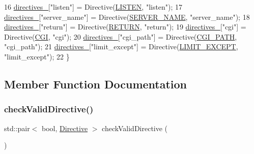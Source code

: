 \begin{DoxyCode}
16         \hyperlink{classft_1_1_parser_abe21d1e60d970dd268181e79250b5399}{directives\_}[\textcolor{stringliteral}{"listen"}] = Directive(\hyperlink{namespaceft_a5a5554dff10f0dc50bae4cc5825ad75da331ec9878c0ed22e62de969d4b96b5bb}{LISTEN}, \textcolor{stringliteral}{"listen"});
17         \hyperlink{classft_1_1_parser_abe21d1e60d970dd268181e79250b5399}{directives\_}[\textcolor{stringliteral}{"server\_name"}] = Directive(\hyperlink{namespaceft_a5a5554dff10f0dc50bae4cc5825ad75da8e7adb687472b53e3ed632cbcb949d88}{SERVER\_NAME}, \textcolor{stringliteral}{"server\_name"});
18         \hyperlink{classft_1_1_parser_abe21d1e60d970dd268181e79250b5399}{directives\_}[\textcolor{stringliteral}{"return"}] = Directive(\hyperlink{namespaceft_a5a5554dff10f0dc50bae4cc5825ad75da520e09ffec033636dba711f3441cc600}{RETURN}, \textcolor{stringliteral}{"return"});
19         \hyperlink{classft_1_1_parser_abe21d1e60d970dd268181e79250b5399}{directives\_}[\textcolor{stringliteral}{"cgi"}] = Directive(\hyperlink{namespaceft_a5a5554dff10f0dc50bae4cc5825ad75da7b2e2f10add9bba874f82f39725423c5}{CGI}, \textcolor{stringliteral}{"cgi"});
20         \hyperlink{classft_1_1_parser_abe21d1e60d970dd268181e79250b5399}{directives\_}[\textcolor{stringliteral}{"cgi\_path"}] = Directive(\hyperlink{namespaceft_a5a5554dff10f0dc50bae4cc5825ad75da874adc6c563690bc7a39ac6a0060e38a}{CGI\_PATH}, \textcolor{stringliteral}{"cgi\_path"});
21         \hyperlink{classft_1_1_parser_abe21d1e60d970dd268181e79250b5399}{directives\_}[\textcolor{stringliteral}{"limit\_except"}] = Directive(\hyperlink{namespaceft_a5a5554dff10f0dc50bae4cc5825ad75da25b0e84438d71cc28e97f17a01cfde7a}{LIMIT\_EXCEPT}, \textcolor{stringliteral}{"limit\_except"});
22     \}
\end{DoxyCode}


\subsection{Member Function Documentation}
\mbox{\label{classft_1_1_parser_ad48298d21629daf7c9a31e101bf322ba}} 
\subsubsection{\texorpdfstring{check\+Valid\+Directive()}{checkValidDirective()}}
{\footnotesize\ttfamily std\+::pair$<$ bool, \hyperlink{classft_1_1_directive}{Directive} $>$ check\+Valid\+Directive (\begin{DoxyParamCaption}{ }\end{DoxyParamCaption})\hspace{0.3cm}{\ttfamily [private]}}



